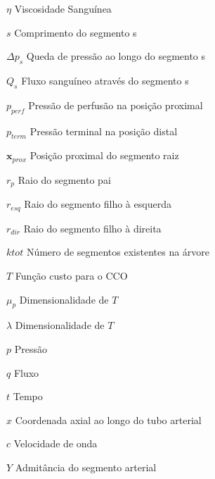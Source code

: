 \documentclass[
        english,			
        brazil			        %
        ,<...>]{abntbibufjf}
\begin{document}
\begin{simbolos} %
\item [$\eta$] Viscosidade Sanguínea \\
\item [$s$] Comprimento do segmento s\\
\item [$\Delta p_s$] Queda de pressão ao longo do segmento s\\
\item [$Q_s$] Fluxo sanguíneo através do segmento s \\
\item [$p_{perf}$] Pressão de perfusão na posição proximal \\
\item [$p_{term}$] Pressão terminal na posição distal \\
\item [$\mathbf{x}_{prox}$] Posição proximal do segmento raiz \\
\item [$r_p$] Raio do segmento pai \\
\item [$r_{esq}$] Raio do segmento filho à esquerda \\
\item [$r_{dir}$] Raio do segmento filho à direita \\
\item [$ktot$] Número de segmentos existentes na árvore \\
\item [$T$] Função custo para o CCO \\
\item [$\mu_p$] Dimensionalidade de $T$ \\
\item [$\lambda$] Dimensionalidade de $T$ \\
\item [$p$] Pressão \\
\item [$q$] Fluxo
\item [$t$] Tempo \\
\item [$x$] Coordenada axial ao longo do tubo arterial \\
\item [$c$] Velocidade de onda \\
\item [$Y$] Admitância do segmento arterial \\

\end{simbolos}
\end{document}
